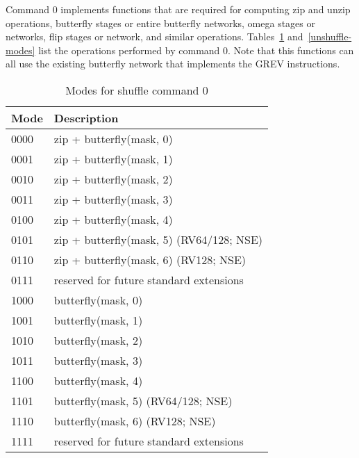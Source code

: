 Command 0 implements functions that are required for computing zip and unzip
operations, butterfly stages or entire butterfly networks, omega stages or networks, flip
stages or network, and similar operations. Tables~\ref{shuffle-modes} and~\ref{unshuffle-modes}
list the operations performed by command 0. Note that this functions can all use the
existing butterfly network that implements the GREV instructions.

\begin{table}[h]
\begin{small}
\begin{center}
\begin{tabular}{l l}
Mode & Description \\ \hline

0000 & zip + butterfly(mask, 0) \\
0001 & zip + butterfly(mask, 1) \\
0010 & zip + butterfly(mask, 2) \\
0011 & zip + butterfly(mask, 3) \\
0100 & zip + butterfly(mask, 4) \\
0101 & zip + butterfly(mask, 5) (RV64/128; NSE) \\
0110 & zip + butterfly(mask, 6) (RV128; NSE) \\
0111 & reserved for future standard extensions \\

\hline

1000 & butterfly(mask, 0) \\
1001 & butterfly(mask, 1) \\
1010 & butterfly(mask, 2) \\
1011 & butterfly(mask, 3) \\
1100 & butterfly(mask, 4) \\
1101 & butterfly(mask, 5) (RV64/128; NSE) \\
1110 & butterfly(mask, 6) (RV128; NSE) \\
1111 & reserved for future standard extensions \\

\hline

\end{tabular}
\end{center}
\end{small}
\caption{Modes for shuffle command 0}
\label{shuffle-modes}
\end{table}

